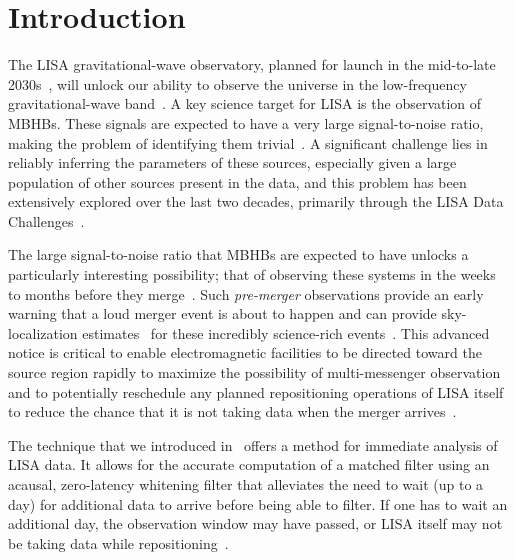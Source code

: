 \section{Introduction}
\label{sec:intro}

The \ac{LISA} gravitational-wave observatory, planned for launch in the mid-to-late
2030s~\cite{LISA:2017pwj, Colpi:2024xhw}, will unlock our ability to observe the universe
in the low-frequency gravitational-wave band~\cite{LISA:2022yao}. A key science target
for \ac{LISA} is the observation of \acp{MBHB}. These signals are expected to have a very large
signal-to-noise ratio, making the problem of identifying them trivial~\cite{LISA:2022yao}.
A significant challenge lies in reliably inferring the parameters of these sources, especially
given a large population of other sources present in the data, and this problem has been
extensively explored over the last two decades, primarily through the LISA Data
Challenges~\cite{Arnaud:2006gm, MockLISADataChallengeTaskForce:2006sgi, Arnaud:2007vr,
MockLISADataChallengeTaskForce:2007iof, Babak:2008aa, Arnaud:2007jy,
MockLISADataChallengeTaskForce:2009wir, Baghi:2022ucj, LDC_WEBSITE}.

The large signal-to-noise ratio that \acp{MBHB} are expected to have unlocks a particularly
interesting possibility; that of observing these systems
in the weeks to months before they merge~\cite{CabournDavies:2024hea, Houba:2024mqj,
Ruan:2024qch}. Such \textit{pre-merger} observations provide an early warning that a loud merger
event is about to happen and can provide sky-localization
estimates~\cite{CabournDavies:2024hea, Kocsis:2007yu, McWilliams:2011zs, Saini:2022hrs}
for these incredibly science-rich events~\cite{DalCanton:2019wsr}.
This advanced notice is critical to enable
electromagnetic facilities to be directed toward the source region rapidly to maximize
the possibility of multi-messenger observation and to potentially reschedule any planned repositioning operations of \ac{LISA} itself 
to reduce the chance that it is not taking data when the merger arrives~\cite{Colpi:2024xhw,Castelli:2024sdb}.

The technique that we introduced in~\cite{CabournDavies:2024hea} offers a method for immediate analysis of LISA data.
It allows for the accurate computation of a matched filter using an acausal, zero-latency whitening filter that alleviates the need to wait (up to a day) for additional data to arrive before being able to filter.
If one has to wait an additional day, the observation window may have passed, or \ac{LISA} itself may not be taking data while repositioning~\cite{Colpi:2024xhw,Castelli:2024sdb}.

